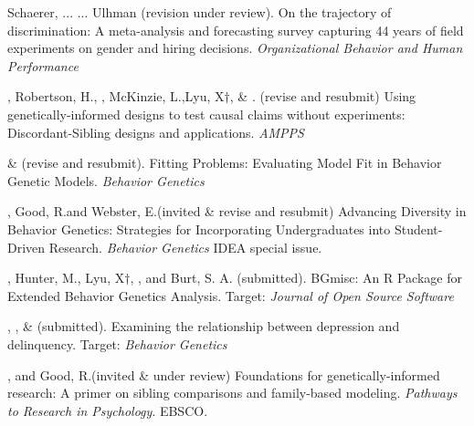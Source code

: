 \item Schaerer, ... \meb ... Ulhman (revision under review). On the trajectory of discrimination: A meta-analysis and forecasting survey capturing 44 years of field experiments on gender and hiring decisions. \textit{Organizational Behavior and Human Performance}

\item \meb, Robertson, H.\noteA, \jt, McKinzie, L.,\noteA Lyu, X$\dagger$, \& \joe. (revise and resubmit) Using genetically-informed designs to test causal claims without experiments: Discordant-Sibling designs and applications. \href{https://osf.io/zpdwt/}{\small\color{blue}{osf.io/zpdwt/}} \textit{AMPPS} %

\item \meb \& \joe (revise and resubmit). Fitting Problems: Evaluating Model Fit in Behavior Genetic Models. \textit{Behavior Genetics}  \href{https://doi.org/10.31234/osf.io/qys83}{\small\color{blue}{10.31234/osf.io/qys83}}

\item \meb, Good, R.\noteA and Webster, E.\noteA  (invited \& revise and resubmit) Advancing Diversity in Behavior Genetics: Strategies for Incorporating Undergraduates into Student-Driven Research. \textit{Behavior Genetics} IDEA special issue. \href{10.31234/osf.io/9x7wf}{\small\color{blue}{10.31234/osf.io/9x7wf}} 

\item \meb, Hunter, M., Lyu, X$\dagger$, \jdt, and Burt, S. A. (submitted). BGmisc: An R Package for Extended Behavior Genetics Analysis. Target: \textit{Journal of Open Source Software}

\item \emsims, \jt, \& \meb (submitted). Examining the relationship between depression and delinquency. Target: \textit{Behavior Genetics}

\item \meb, and Good, R.\noteA (invited \& under review) Foundations for genetically-informed research: A primer on sibling comparisons and family-based modeling. \textit{Pathways to Research in Psychology}. EBSCO.


